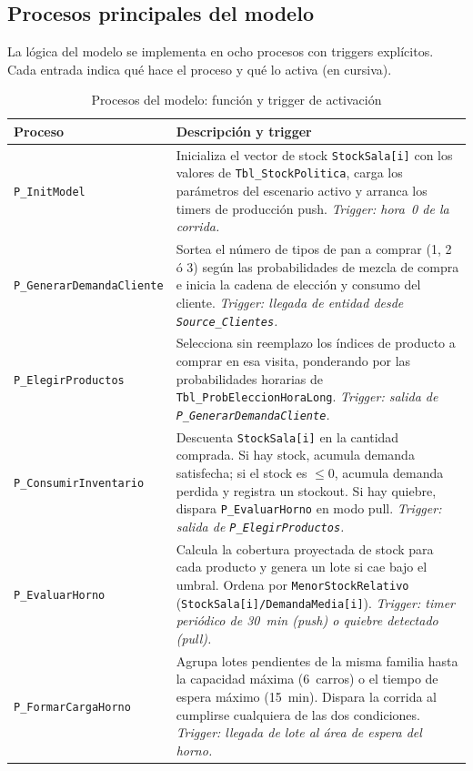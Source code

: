 \documentclass[12pt]{article}
\begin{document}
\subsection{Procesos principales del modelo}

La lógica del modelo se implementa en ocho procesos con triggers explícitos. Cada entrada indica qué hace el proceso y qué lo activa (en cursiva).

\begin{table}[H]
\centering
\caption{Procesos del modelo: función y trigger de activación}
\label{tab:procesos}
\renewcommand{\arraystretch}{1.45}
\begin{tabularx}{\textwidth}{p{3.4cm}X}
\toprule
\rowcolor{tabhead}
\color{white}\textbf{Proceso} &
\color{white}\textbf{Descripción y trigger} \\
\midrule
\rowcolor{tabrow}\texttt{P\_InitModel} &
Inicializa el vector de stock \texttt{StockSala[i]} con los valores de \texttt{Tbl\_StockPolitica}, carga los parámetros del escenario activo y arranca los timers de producción push. \textit{Trigger: hora~0 de la corrida.} \\
\texttt{P\_Generar\-DemandaCliente} &
Sortea el número de tipos de pan a comprar (1, 2 ó 3) según las probabilidades de mezcla de compra e inicia la cadena de elección y consumo del cliente. \textit{Trigger: llegada de entidad desde \texttt{Source\_Clientes}.} \\
\rowcolor{tabrow}\texttt{P\_Elegir\-Productos} &
Selecciona sin reemplazo los índices de producto a comprar en esa visita, ponderando por las probabilidades horarias de \texttt{Tbl\_ProbEleccionHoraLong}. \textit{Trigger: salida de \texttt{P\_GenerarDemandaCliente}.} \\
\texttt{P\_Consumir\-Inventario} &
Descuenta \texttt{StockSala[i]} en la cantidad comprada. Si hay stock, acumula demanda satisfecha; si el stock es $\leq$0, acumula demanda perdida y registra un stockout. Si hay quiebre, dispara \texttt{P\_EvaluarHorno} en modo pull. \textit{Trigger: salida de \texttt{P\_ElegirProductos}.} \\
\rowcolor{tabrow}\texttt{P\_Evaluar\-Horno} &
Calcula la cobertura proyectada de stock para cada producto y genera un lote si cae bajo el umbral. Ordena por \texttt{MenorStockRelativo} (\texttt{StockSala[i]/DemandaMedia[i]}). \textit{Trigger: timer periódico de 30~min (push) o quiebre detectado (pull).} \\
\texttt{P\_Formar\-CargaHorno} &
Agrupa lotes pendientes de la misma familia hasta la capacidad máxima (6~carros) o el tiempo de espera máximo (15~min). Dispara la corrida al cumplirse cualquiera de las dos condiciones. \textit{Trigger: llegada de lote al área de espera del horno.} \\

\end{tabularx}
\end{table}
\end{document}
